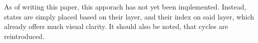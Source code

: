 As of writing this paper, this apporach has not yet been implemented. Instead, states are simply placed based on their layer, and their index on said layer, which already offers much visual clarity. It should also be noted, that cycles are reintroduced.


